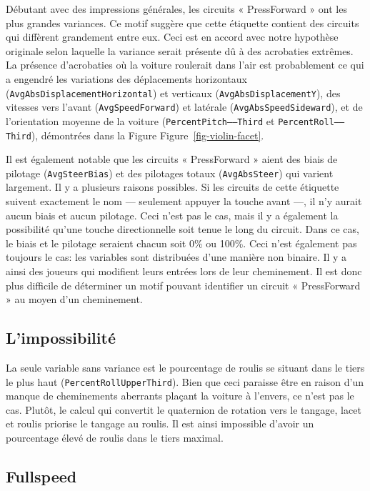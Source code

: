 \documentclass[
  oneside,
  open=any]{scrreprt}
\begin{document}
Débutant avec des impressions générales, les circuits « PressForward »
ont les plus grandes variances. Ce motif suggère que cette étiquette
contient des circuits qui diffèrent grandement entre eux. Ceci est en
accord avec notre hypothèse originale selon laquelle la variance serait
présente dû à des acrobaties extrêmes. La présence d'acrobaties où la
voiture roulerait dans l'air est probablement ce qui a engendré les
variations des déplacements horizontaux
(\texttt{AvgAbsDisplacementHorizontal}) et verticaux
(\texttt{AvgAbsDisplacementY}), des vitesses vers l'avant
(\texttt{AvgSpeedForward}) et latérale (\texttt{AvgAbsSpeedSideward}),
et de l'orientation moyenne de la voiture (\texttt{PercentPitch——Third}
et \texttt{PercentRoll——Third}), démontrées dans la Figure
Figure~\ref{fig-violin-facet}.

Il est également notable que les circuits « PressForward » aient des
biais de pilotage (\texttt{AvgSteerBias}) et des pilotages totaux
(\texttt{AvgAbsSteer}) qui varient largement. Il y a plusieurs raisons
possibles. Si les circuits de cette étiquette suivent exactement le nom
--- seulement appuyer la touche avant ---, il n'y aurait aucun biais et
aucun pilotage. Ceci n'est pas le cas, mais il y a également la
possibilité qu'une touche directionnelle soit tenue le long du circuit.
Dans ce cas, le biais et le pilotage seraient chacun soit 0\% ou 100\%.
Ceci n'est également pas toujours le cas: les variables sont distribuées
d'une manière non binaire. Il y a ainsi des joueurs qui modifient leurs
entrées lors de leur cheminement. Il est donc plus difficile de
déterminer un motif pouvant identifier un circuit « PressForward » au
moyen d'un cheminement.

\subsection{L'impossibilité}\label{limpossibilituxe9}

La seule variable sans variance est le pourcentage de roulis se situant
dans le tiers le plus haut (\texttt{PercentRollUpperThird}). Bien que
ceci paraisse être en raison d'un manque de cheminements aberrants
plaçant la voiture à l'envers, ce n'est pas le cas. Plutôt, le calcul
qui convertit le quaternion de rotation vers le tangage, lacet et roulis
priorise le tangage au roulis. Il est ainsi impossible d'avoir un
pourcentage élevé de roulis dans le tiers maximal.

\subsection{Fullspeed}\label{fullspeed}
\end{document}
